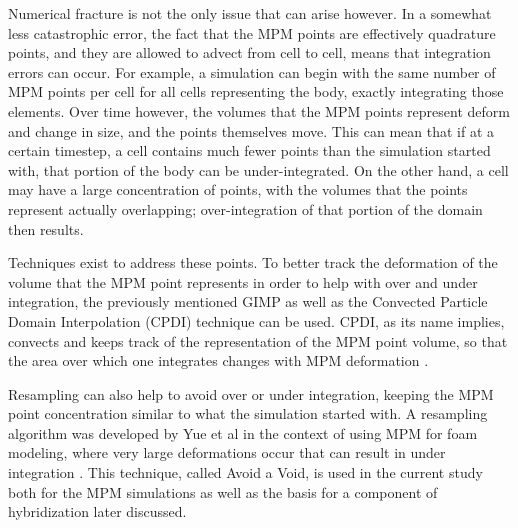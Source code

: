 Numerical fracture is not the only issue that can arise however. In a somewhat less catastrophic error, the fact that the MPM points are effectively quadrature points, and they are allowed to advect from cell to cell, means that integration errors can occur. For example, a simulation can begin with the same number of MPM points per cell for all cells representing the body, exactly integrating those elements. Over time however, the volumes that the MPM points represent deform and change in size, and the points themselves move. This can mean that if at a certain timestep, a cell contains much fewer points than the simulation started with, that portion of the body can be under-integrated. On the other hand, a cell may have a large concentration of points, with the volumes that the points represent actually overlapping; over-integration of that portion of the domain then results.

Techniques exist to address these points. To better track the deformation of the volume that the MPM point represents in order to help with over and under integration, the previously mentioned GIMP as well as the Convected Particle Domain Interpolation (CPDI) technique can be used. CPDI, as its name implies, convects and keeps track of the representation of the MPM point volume, so that the area over which one integrates changes with MPM deformation \cite{Sadeghirad:2011}.

Resampling can also help to avoid over or under integration, keeping the MPM point concentration similar to what the simulation started with. A resampling algorithm was developed by Yue et al in the context of using MPM for foam modeling, where very large deformations occur that can result in under integration \cite{Yue:2015:Continuum}. This technique, called Avoid a Void, is used in the current study both for the MPM simulations as well as the basis for a component of hybridization later discussed. 